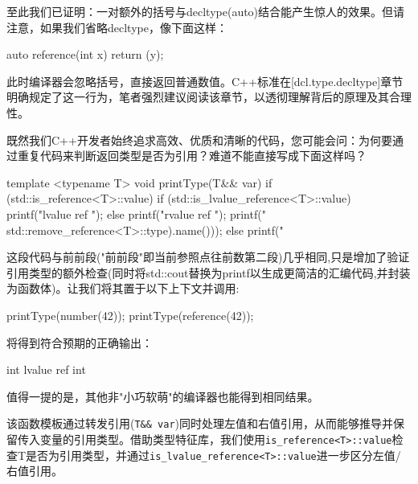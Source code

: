 至此我们已证明：一对额外的括号与decltype(auto)结合能产生惊人的效果。但请注意，如果我们省略decltype，像下面这样：

\begin{cpp}
auto reference(int x) {
  return (y);
}
\end{cpp}

此时编译器会忽略括号，直接返回普通数值。C++标准在[dcl.type.decltype]章节明确规定了这一行为，笔者强烈建议阅读该章节，以透彻理解背后的原理及其合理性。

既然我们C++开发者始终追求高效、优质和清晰的代码，您可能会问：为何要通过重复代码来判断返回类型是否为引用？难道不能直接写成下面这样吗？

\begin{cpp}
template <typename T>
void printType(T&& var) {
  if (std::is_reference<T>::value) {
    if (std::is_lvalue_reference<T>::value) {
      printf("lvalue ref ");
    } else {
      printf("rvalue ref ");
    }
    printf("%
    std::remove_reference<T>::type).name()));
  } else {
    printf("%
  }
}
\end{cpp}

这段代码与前前段("前前段"即当前参照点往前数第二段)几乎相同,只是增加了验证引用类型的额外检查(同时将std::cout替换为printf以生成更简洁的汇编代码,并封装为函数体)。让我们将其置于以下上下文并调用:

\begin{cpp}
printType(number(42));
printType(reference(42));
\end{cpp}

将得到符合预期的正确输出：

\begin{shell}
int
lvalue ref int
\end{shell}

值得一提的是，其他非"小巧软萌"的编译器也能得到相同结果。

该函数模板通过转发引用(\verb|T&& var|)同时处理左值和右值引用，从而能够推导并保留传入变量的引用类型。借助类型特征库，我们使用\verb|is_reference<T>::value|检查T是否为引用类型，并通过\verb|is_lvalue_reference<T>::value|进一步区分左值/右值引用。

